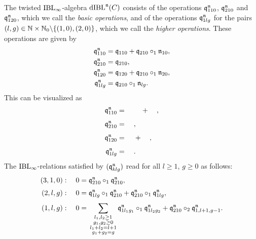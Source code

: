 \documentclass[\MainFolder/Text.tex]{subfiles}
\begin{document}
\begin{Proposition}
The twisted $\mathrm{IBL}_\infty$-algebra $\mathrm{dIBL}^{\mathfrak{n}}(C)$ consists of the operations $\mathfrak{q}_{110}^{\mathfrak{n}}$, $\mathfrak{q}_{210}^{\mathfrak{n}}$ and~$\mathfrak{q}_{120}^{\mathfrak{n}}$, which we call the \emph{basic operations}, and of the operations $\mathfrak{q}_{1lg}^{\mathfrak{n}}$ for the pairs $(l,g)\in \mathbb{N} \times \mathbb{N}_0 \backslash \{(1,0),(2,0)\}$, which we call the \emph{higher operations}. These operations are given by 
$$ \begin{aligned}
\mathfrak{q}_{110}^{\mathfrak{n}} &= \mathfrak{q}_{110} + \mathfrak{q}_{210}\circ_1 \mathfrak{n}_{10},\\
\mathfrak{q}_{210}^{\mathfrak{n}} &= \mathfrak{q}_{210}, \\
\mathfrak{q}_{120}^{\mathfrak{n}} & = \mathfrak{q}_{120} + \mathfrak{q}_{210}\circ_1 \mathfrak{n}_{20},\\
\mathfrak{q}_{1lg}^{\mathfrak{n}} & = \mathfrak{q}_{210}\circ_1 \mathfrak{n}_{lg}.
\end{aligned}$$
This can be visualized as
{ \begingroup \allowdisplaybreaks
\def\dist{0.25} %
  \def\rad{0.5} %
  \def\ecc{0.1} %
  \def\hght{1} %
  \def\dif{1.5} %
  \def\radO{\rad} %
  \def\eccO{\ecc} %
  \def\hghtO{2*\hght+\dist} %
  \def\difO{\dif} %
  \def\gencanc{0.05} %
  \def\genecc{20} %
  \def\genrad{0.45} %
\begin{align*}
\OPQ_{110}^\PMC & =\quad\vcenterline{}\quad +\quad \vcenterline{}, \\[1ex] 
\OPQ_{210}^\PMC &=\quad \vcenterline{}, \\[1ex] 
\OPQ_{120}^\PMC &=\quad \vcenterline{}+\quad\vcenterline{}, \\[1ex]
\OPQ^{\PMC}_{1lg} & =\quad \vcenterline{}.
\end{align*}
\endgroup}
The $\mathrm{IBL}_\infty$-relations satisfied by $(\mathfrak{q}_{klg}^{\mathfrak{n}})$ read for all $l\ge 1$, $g\ge 0$ as follows:
\begin{equation}\label{Eq:IBLInftydIBL}
\begin{aligned}
(3,1,0):\quad 0& = \OPQ_{210}^\PMC \circ_1 \OPQ_{210}^\PMC, \\[\jot]
(2,l,g):\quad 0&=\OPQ^\PMC_{1lg}\circ_1 \OPQ^\PMC_{210} + \OPQ^\PMC_{210}\circ_1\OPQ^\PMC_{1lg}, \\[\jot]
(1,l,g):\quad 0&= \begin{multlined}[t] \sum_{\substack{l_1, l_2 \ge 1 \\ g_1, g_2 \ge 0 \\ l_1 + l_2 = l+1 \\ g_1 + g_2 = g}} \OPQ^\PMC_{1l_1 g_1}\circ_1 \OPQ^\PMC_{1 l_2 g_2}+\OPQ^\PMC_{210} \circ_2 \OPQ^\PMC_{1, l+1, g-1}.\end{multlined}

\end{aligned}
\end{equation}
\end{Proposition}
\end{document}
